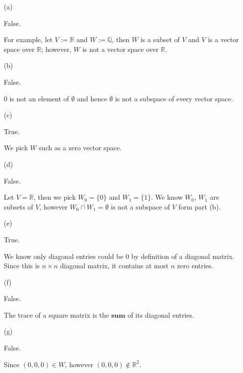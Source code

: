 
\begin{Exercise}
	\begin{enumerate}[(a)]
		\item[(a)]
		\begin{answer}
			False.
		\end{answer}
		\begin{solution}
			For example, let $V := \mathbb{R}$ and $W := \mathbb{Q}$, then $W$ is a subset of $V$ and $V$ is a vector space over $\mathbb{R}$; however, $W$ is not a vector space over $\mathbb{R}$.
		\end{solution}
		
		\item[(b)]
		\begin{answer}
			False.
		\end{answer}
		\begin{solution}
			$0$ is not an element of $\emptyset$ and hence $\emptyset$ is not a subspace of every vector space.
		\end{solution}
		
		\item[(c)]
		\begin{answer}
			True.
		\end{answer}
		\begin{solution}
			We pick $W$ such as a zero vector space.
		\end{solution}
		
		\item[(d)]
		\begin{answer}
			False.
		\end{answer}
		\begin{solution}
			Let $V = \mathbb{R}$, then we pick $W_0 = \{0\}$ and $W_1 = \{1\}$. We know $W_0$, $W_1$ are subsets of $V$, however $W_0\cap W_1 = \emptyset$ is not a subspace of $V$ form part (b).
		\end{solution}
		
		\item[(e)]
		\begin{answer}
			True.
		\end{answer}
		\begin{solution}
			We know only diagonal entries could be $0$ by definition of a diagonal matrix. Since this is $n\times n$ diagonal matrix, it contains at most $n$ zero entries.
		\end{solution}
		
		\item[(f)]
		\begin{answer}
			False.
		\end{answer}
		\begin{solution}
			The trace of a square matrix is the $\mathbf{sum}$ of its diagonal entries.
		\end{solution}
		
		\item[(g)]
		\begin{answer}
			False.
		\end{answer}
		\begin{solution}
			Since $(0,0,0)\in W$, however $(0,0,0)\notin \mathbb{R}^2$.
		\end{solution}
		
	\end{enumerate}
\end{Exercise}